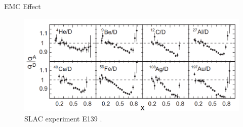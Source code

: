 \documentclass[12pt]{beamer}
\begin{document}

\begin{frame}{EMC Effect}

\begin{figure}
	\caption*{\label{EMC_slac} SLAC experiment E139 \cite{slac_emc} .}
	\includegraphics[width =12cm]{../images/EMC_slac_horiz.png}
\end{figure}


\end{frame}
\end{document}
